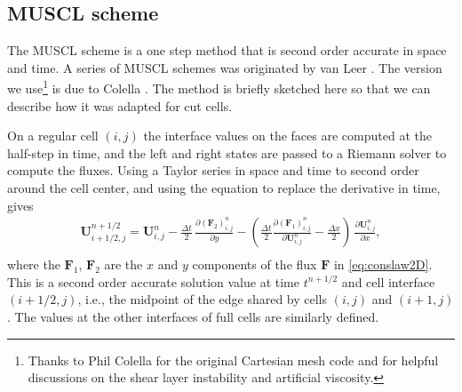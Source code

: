 \subsection{MUSCL scheme} \label{sec:muscl}
The MUSCL scheme is a one step method that is second order accurate in
space and time. A series of MUSCL schemes  was originated by van Leer 
\cite{vanleer:muscl}. The version we use\footnote{Thanks to Phil 
Colella for the original Cartesian mesh code and for helpful discussions on the shear
layer instability and artificial viscosity.}
is due to Colella \cite{Colella:Unsplit}.
The method is briefly sketched here so that we can describe how it was
adapted for cut cells. 

On a regular cell $(i,j)$ the interface values on the 
faces are computed at the half-step in time, and the left and right states
are passed to a Riemann
solver to compute the fluxes.
Using a Taylor series in space and time to second order around the
cell center, and using the equation to replace the derivative in time, gives 
\begin{equation}\label{taylor}
\begin{split}
\mathbf{U}_{i+1/2,j}^{n+1/2}   = \mathbf{U}_{i,j}^n - \frac{\Delta t}{2} \, 
             \frac{\partial (\mathbf{F}_2)_{i,j}^n}{\partial y}  -
            \left( \frac{\Delta t}{2} 
            \frac{\partial (\mathbf{F}_1)_{i,j}^n}{\partial \mathbf{U}^n_{i,j}} -
             \frac{\Delta x}{2} \right) \,\frac{\partial \mathbf{U}_{i,j}^n}{\partial x}, \\[.08in]
\end{split}
\end{equation}
where the $\mathbf{F}_1$, $\mathbf{F}_2$ are the $x$ and $y$ components of the flux $\mathbf{F}$ in \eqref{eq:conslaw2D}.  This is a second order accurate solution value at time $t^{n+1/2}$ and cell interface $(i+1/2,j)$, i.e., the midpoint of the edge shared by cells $(i,j)$ and $(i+1,j)$.
The values at the other interfaces of full cells are similarly defined.

